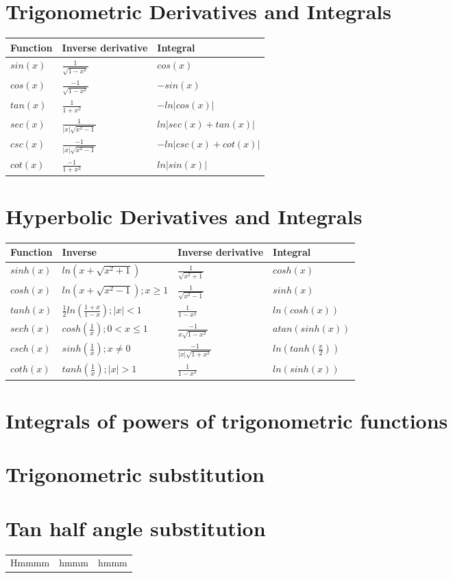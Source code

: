 \documentclass{article}
\begin{document}
\section{Trigonometric Derivatives and Integrals}
\begin{table}[h]
	\centering
	\begin{tabularx}{0.75\textwidth}{ X X X }
		Function & Inverse derivative & Integral \\
		\hline
		$sin(x)$ & $\frac{1}{\sqrt{1 - x^2}}$ & $cos(x)$ \\
		$cos(x)$ & $\frac{-1}{\sqrt{1 - x^2}}$ & $-sin(x)$ \\
		$tan(x)$ & $\frac{1}{1 + x^2}$ & $-ln|cos(x)|$ \\
		$sec(x)$ & $\frac{1}{|x|\sqrt{x^2 - 1}}$ & $ln|sec(x) + tan(x)|$ \\
		$csc(x)$ & $\frac{-1}{|x|\sqrt{x^2 - 1}}$ & $-ln|csc(x) + cot(x)|$ \\
		$cot(x)$ & $\frac{-1}{1 + x^2}$ & $ln|sin(x)|$ \\
	\end{tabularx}
\end{table}

\section{Hyperbolic Derivatives and Integrals}
\begin{table}[h]
	\centering
	\begin{tabularx}{0.85\textwidth}{ X X X X }
		Function & Inverse & Inverse derivative & Integral \\
		\hline
		$sinh(x)$ & $ln(x + \sqrt{x^2 + 1})$ & $\frac{1}{\sqrt{x^2 + 1}}$ & $cosh(x)$ \\
		$cosh(x)$ & $ln(x + \sqrt{x^2 - 1}); x \ge 1$ & $\frac{1}{\sqrt{x^2 - 1}}$ & $sinh(x)$ \\
		$tanh(x)$ & $\frac{1}{2}ln(\frac{1 + x}{1 - x}); |x| < 1$ & $\frac{1}{1 - x^2}$ & $ln(cosh(x))$ \\
		$sech(x)$ & $cosh(\frac{1}{x}); 0 < x \le 1$ & $\frac{-1}{x\sqrt{1 - x^2}}$ & $atan(sinh(x))$ \\
		$csch(x)$ & $sinh(\frac{1}{x}); x \neq 0$ & $\frac{-1}{|x|\sqrt{1 + x^2}}$ & $ln(tanh(\frac{x}{2}))$ \\
		$coth(x)$ & $tanh(\frac{1}{x}); |x| > 1$ & $\frac{1}{1 - x^2}$ & $ln(sinh(x))$ \\
	\end{tabularx}
\end{table}

\section{Integrals of powers of trigonometric functions}

\section{Trigonometric substitution}

\section{Tan half angle substitution}
\begin{table}[h]
	\centering
	\begin{tabularx}{0.75\textwidth}{ X X X}
		Hmmmm & hmmm & hmmm \\
	\end{tabularx}
\end{table}
\end{document}
